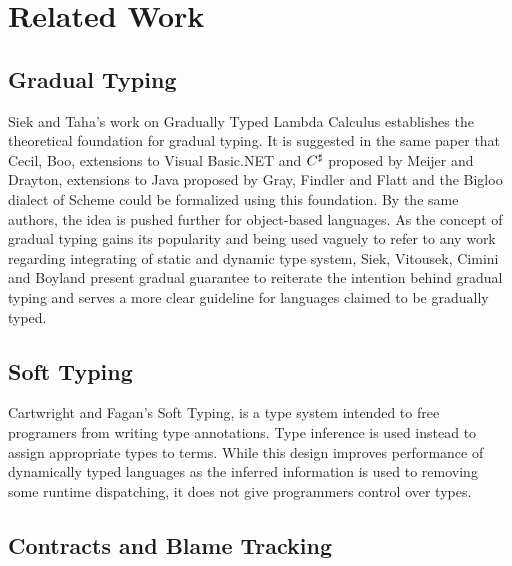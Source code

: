 \section{Related Work}

\subsection{Gradual Typing}
Siek and Taha's work on Gradually Typed Lambda Calculus\cite{siek2006gradual}
establishes the theoretical foundation for gradual typing.
It is suggested in the same paper that Cecil\cite{chambers2004cecil}, Boo\cite{de2005boo},
extensions to Visual Basic.NET and $C^\sharp$ proposed by Meijer and Drayton\cite{meijer2004static},
extensions to Java proposed by Gray, Findler and Flatt\cite{gray2005fine}
and the Bigloo \cite{bres2004compiling,serrano2002bigloo} dialect of Scheme\cite{abelson1998revised}
could be formalized using this foundation.
By the same authors,
the idea is pushed further for object-based languages\cite{siek2007gradual}.
As the concept of gradual typing gains its popularity and being used vaguely to
refer to any work regarding integrating of static and dynamic type system,
Siek, Vitousek, Cimini and Boyland present gradual guarantee\cite{siek2015refined}
to reiterate the intention behind gradual typing and serves a more clear guideline for
languages claimed to be gradually typed.

\subsection{Soft Typing}
Cartwright and Fagan's Soft Typing\cite{cartwright1991soft},
is a type system intended to free programers from writing type annotations.
Type inference is used instead to assign appropriate types to terms.
While this design improves performance of dynamically typed languages
as the inferred information is used to removing some runtime dispatching,
it does not give programmers control over types.

\subsection{Contracts and Blame Tracking}


